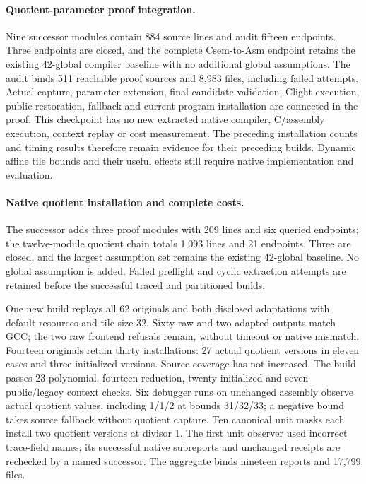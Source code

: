 \paragraph{Quotient-parameter proof integration.}
Nine successor modules contain 884 source lines and audit fifteen endpoints.
Three endpoints are closed, and the complete Csem-to-Asm endpoint retains the
existing 42-global compiler baseline with no additional global assumptions.
The audit binds 511 reachable proof sources and 8,983 files, including failed
attempts. Actual capture, parameter extension, final candidate validation,
Clight execution, public restoration, fallback and current-program installation
are connected in the proof. This checkpoint has no new extracted native
compiler, C/assembly execution, context replay or cost measurement.
The preceding installation counts and timing results therefore remain evidence
for their preceding builds. Dynamic affine tile bounds and their useful effects
still require native implementation and evaluation.

\paragraph{Native quotient installation and complete costs.}
The successor adds three proof modules with 209 lines and six queried endpoints;
the twelve-module quotient chain totals 1,093 lines and 21 endpoints. Three are
closed, and the largest assumption set remains the existing 42-global baseline.
No global assumption is added. Failed preflight and cyclic extraction attempts
are retained before the successful traced and partitioned builds.

One new build replays all 62 originals and both disclosed adaptations with
default resources and tile size 32. Sixty raw and two adapted outputs match GCC;
the two raw frontend refusals remain, without timeout or native mismatch.
Fourteen originals retain thirty installations: 27 actual quotient versions in
eleven cases and three initialized versions. Source coverage has not increased.
The build passes 23 polynomial, fourteen reduction, twenty initialized and
seven public/legacy context checks. Six debugger runs on unchanged assembly
observe actual quotient values, including 1/1/2 at bounds 31/32/33; a negative
bound takes source fallback without quotient capture. Ten canonical unit masks
each install two quotient versions at divisor 1. The first unit observer used
incorrect trace-field names; its successful native subreports and unchanged
receipts are rechecked by a named successor. The aggregate binds nineteen
reports and 17,799 files.

